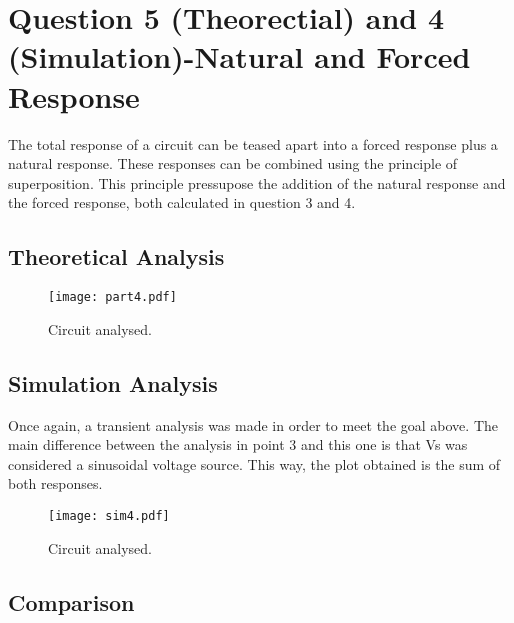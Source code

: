 \section{Question 5 (Theorectial) and 4 (Simulation)-Natural and Forced Response}

The total response of a circuit can be teased apart into a forced response plus a natural response. These responses can be combined using the principle of superposition. This principle pressupose the addition of the natural response and the forced response, both calculated in question 3 and 4.

\subsection{Theoretical Analysis}

\begin{figure}[ht] \centering
\texttt{[image: part4.pdf]}
\caption{Circuit analysed.}
\label{fig:sim4}
\end{figure}



\subsection{Simulation Analysis}
Once again, a transient analysis was made in order to meet the goal above. The main difference between the analysis in point 3 and this one is that Vs was considered a sinusoidal voltage source. This way, the plot obtained is the sum of both responses.

\begin{figure}[ht] \centering
\texttt{[image: sim4.pdf]}
\caption{Circuit analysed.}
\label{fig:sim4}
\end{figure}

\subsection{Comparison}

